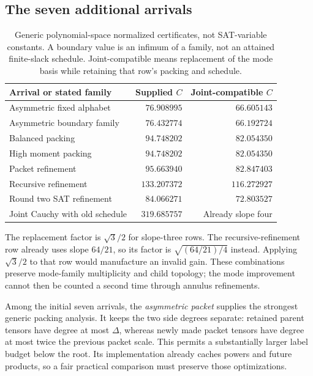 \documentclass[11pt,letterpaper]{article}
\theoremstyle{remark}\newtheorem{remark}[theorem]{Remark}
\begin{document}
\subsection{The seven additional arrivals}
\begin{table}[htbp]\centering\small
\begin{tabular}{@{}p{}rr@{}}
\toprule
Arrival or stated family & Supplied $C$ & Joint-compatible $C$\\\midrule
Asymmetric fixed alphabet & $76.908995$ & $66.605143$\\
Asymmetric boundary family & $76.432774$ & $66.192724$\\
Balanced packing & $94.748202$ & $82.054350$\\
High moment packing & $94.748202$ & $82.054350$\\
Packet refinement & $95.663940$ & $82.847403$\\
Recursive refinement & $133.207372$ & $116.272927$\\
Round two SAT refinement & $84.066271$ & $72.803527$\\
Joint Cauchy with old schedule & $319.685757$ & Already slope four\\\bottomrule
\end{tabular}
\caption{Generic polynomial-space normalized certificates, not SAT-variable constants. A boundary value is an infimum of a family, not an attained finite-slack schedule. Joint-compatible means replacement of the mode basis while retaining that row's packing and schedule.}\label{tab:incoming}
\end{table}
The replacement factor is $\sqrt3/2$ for slope-three rows. The recursive-refinement row already uses slope $64/21$, so its factor is $\sqrt{(64/21)/4}$ instead. Applying $\sqrt3/2$ to that row would manufacture an invalid gain. These combinations preserve mode-family multiplicity and child topology; the mode improvement cannot then be counted a second time through annulus refinements.

Among the initial seven arrivals, the \emph{asymmetric packet} supplies the strongest generic packing analysis. It keeps the two side degrees separate: retained parent tensors have degree at most $\Delta$, whereas newly made packet tensors have degree at most twice the previous packet scale. This permits a substantially larger label budget below the root. Its implementation already caches powers and future products, so a fair practical comparison must preserve those optimizations.
\end{document}
